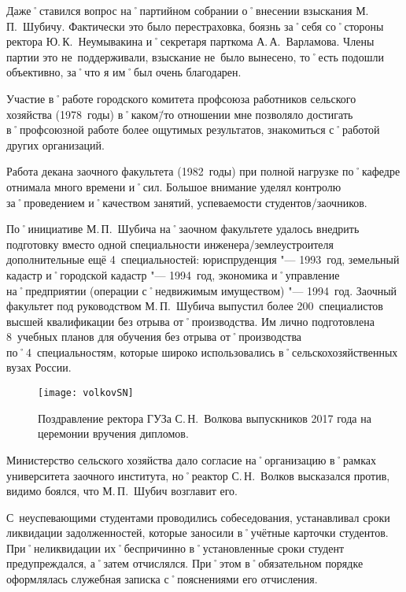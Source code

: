 Даже˚ставился вопрос на˚партийном собрании о˚внесении взыскания М.\,П.~Шубичу. Фактически это было перестраховка, боязнь за˚себя со˚стороны ректора Ю.\,К.~Неумывакина и˚секретаря парткома А.\,А.~Варламова. Члены партии это не~поддерживали, взыскание не~было вынесено, то˚есть подошли объективно, за˚что я им˚был очень благодарен.

Участие в˚работе городского комитета профсоюза работников сельского хозяйства (1978~годы) в˚каком\=/то отношении мне позволяло достигать в˚профсоюзной работе более ощутимых результатов, знакомиться с˚работой других организаций.

Работа декана заочного факультета (1982~годы) при полной нагрузке по˚кафедре отнимала много времени и˚сил. Большое внимание уделял контролю за˚проведением и˚качеством занятий, успеваемости студентов\-/заочников.

По˚инициативе М.\,П.~Шубича на˚заочном факультете удалось внедрить подготовку вместо одной специальности инженера\-/землеустроителя дополнительные ещё 4~специальностей: юриспруденция "--- 1993~год, земельный кадастр и˚городской кадастр "--- 1994~год, экономика и˚управление на˚предприятии (операции с˚недвижимым имуществом) "--- 1994~год. Заочный факультет под руководством М.\,П.~Шубича выпустил более 200~специалистов высшей квалификации без отрыва от˚производства. Им лично подготовлена 8~учебных планов для обучения без отрыва от˚производства по˚4~специальностям, которые широко использовались в˚сельскохозяйственных вузах России. 

\begin{wrapfigure}{O}{.4\textwidth}
\centering
\texttt{[image: volkovSN]}
\caption[{Поздравление ректора ГУЗа С.\,Н.~Волкова выпускников 2017 года на церемонии вручения дипломов}]{Поздравление ректора ГУЗа С.\,Н.~Волкова выпускников 2017 года на церемонии вручения дипломов\footnotemark.}
\label{fig:volkovSN}
\end{wrapfigure}

Министерство сельского хозяйства дало согласие на˚организацию в˚рамках университета заочного института, но˚реактор С.\,Н.~Волков высказался против, видимо боялся, что М.\,П.~Шубич возглавит его.

С~неуспевающими студентами проводились собеседования, устанавливал сроки ликвидации задолженностей, которые заносили в˚учётные карточки студентов. При˚неликвидации их˚беспричинно в˚установленные сроки студент предупреждался, а˚затем отчислялся. При˚этом в˚обязательном порядке оформлялась служебная записка с˚пояснениями его отчисления.

